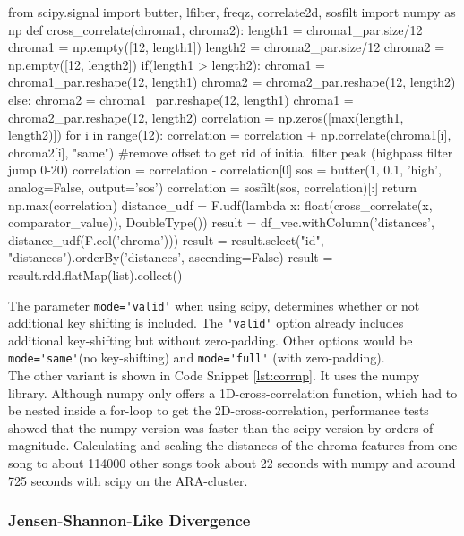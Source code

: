 \begin{pythonCode}[frame=single,label={lst:corrnp},caption={Cross-correlation numpy},captionpos=b]
from scipy.signal import butter, lfilter, freqz, correlate2d, sosfilt
import numpy as np
def cross_correlate(chroma1, chroma2):
    length1 = chroma1_par.size/12
    chroma1 = np.empty([12, length1])
    length2 = chroma2_par.size/12
    chroma2 = np.empty([12, length2])
    if(length1 > length2):
        chroma1 = chroma1_par.reshape(12, length1)
        chroma2 = chroma2_par.reshape(12, length2)
    else:
        chroma2 = chroma1_par.reshape(12, length1)
        chroma1 = chroma2_par.reshape(12, length2)      
    correlation = np.zeros([max(length1, length2)])
    for i in range(12):
        correlation = correlation + np.correlate(chroma1[i], chroma2[i], "same")    
    #remove offset to get rid of initial filter peak (highpass filter jump 0-20)
    correlation = correlation - correlation[0]
    sos = butter(1, 0.1, 'high', analog=False, output='sos')
    correlation = sosfilt(sos, correlation)[:]
    return np.max(correlation)
distance_udf = F.udf(lambda x: float(cross_correlate(x, comparator_value)), DoubleType())
result = df_vec.withColumn('distances', distance_udf(F.col('chroma')))
result = result.select("id", "distances").orderBy('distances', ascending=False)
result = result.rdd.flatMap(list).collect()
\end{pythonCode}

\noindent The parameter \lstinline{mode='valid'} when using scipy, determines whether or not additional key shifting is included. The \lstinline{'valid'} option already includes additional key-shifting but without zero-padding. Other options would be \lstinline{mode='same'}(no key-shifting) and \lstinline{mode='full'} (with zero-padding).\\
\noindent The other variant is shown in Code Snippet \ref{lst:corrnp}. It uses the numpy library. Although numpy only offers a 1D-cross-correlation function, which had to be nested inside a for-loop to get the 2D-cross-correlation, performance tests showed that the numpy version was faster than the scipy version by orders of magnitude. Calculating and scaling the distances of the chroma features from one song to about 114000 other songs took about 22 seconds with numpy and around 725 seconds with scipy on the ARA-cluster. 

\subsubsection{Jensen-Shannon-Like Divergence}\label{jsld}

